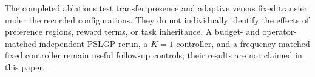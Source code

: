 The completed ablations test transfer presence and adaptive versus fixed transfer under the recorded configurations. They do not individually identify the effects of preference regions, reward terms, or task inheritance. A budget- and operator-matched independent PSLGP rerun, a $K=1$ controller, and a frequency-matched fixed controller remain useful follow-up controls; their results are not claimed in this paper.
\endgroup